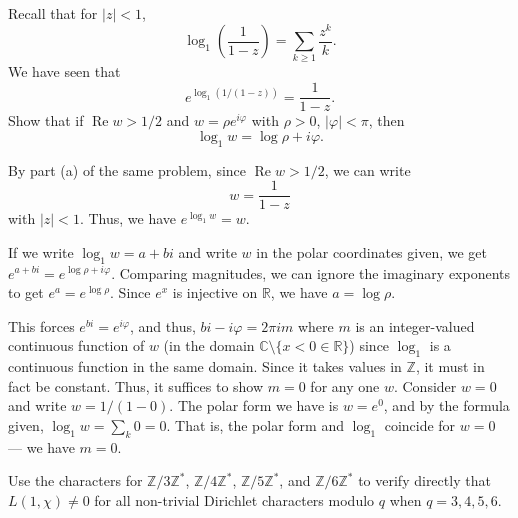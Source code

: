 \documentclass[12 pt, letterpaper]{hmcpset}
\begin{document}
\begin{problem}[S \& S \S 8.4 \#7(b)]
	Recall that for $\lvert z \rvert < 1$,
	\[
		\log_{1} \left ( \frac{1}{1 - z} \right ) = \sum_{k \ge 1} \frac{z^{k}}{k}.
	\]
	We have seen that
	\[
		e^{\log_{1} (1 / (1 - z))} = \frac{1}{1 - z}.
	\]
	Show that if $\operatorname{Re} w > 1 /2$ and $w = \rho e^{i \varphi}$ with $\rho > 0$, $\lvert \varphi \rvert < \pi$, then
	\[
		\log_{1} w = \log \rho + i \varphi.
	\]
\end{problem}

\begin{solution}
	By part (a) of the same problem, since $\operatorname{Re} w > 1 / 2$, we can write
	\[
		w = \frac{1}{1 - z}
	\]
	with $\lvert z \rvert < 1$. Thus, we have $e^{\log_{1} w} = w$.

	If we write $\log_{1} w = a + b i$ and write $w$ in the polar coordinates given, we get $e^{a + b i} = e^{\log \rho + i \varphi}$. Comparing magnitudes, we can ignore the imaginary exponents to get $e^{a} = e^{\log \rho}$. Since $e^{x}$ is injective on $\mathbb{R}$, we have $a = \log \rho$.

	This forces $e^{bi} = e^{i \varphi}$, and thus, $bi - i \varphi = 2 \pi i m$ where $m$ is an integer-valued continuous function of $w$ (in the domain $\mathbb{C} \setminus \{ x < 0 \in \mathbb{R} \}$) since $\log_{1}$ is a continuous function in the same domain. Since it takes values in $\mathbb{Z}$, it must in fact be constant. Thus, it suffices to show $m = 0$ for any one $w$. Consider $w = 0$ and write $w = 1 / (1 - 0)$. The polar form we have is $w = e^{0}$, and by the formula given, $\log_{1} w = \sum_{k} 0 = 0$. That is, the polar form and $\log_{1}$ coincide for $w = 0$ --- we have $m = 0$.
\end{solution}

\pagebreak

\begin{problem}[S \& S \S 8.4 \#11]
	Use the characters for $\mathbb{Z} / 3 \mathbb{Z}^{*}$, $\mathbb{Z} / 4 \mathbb{Z}^{*}$, $\mathbb{Z} / 5 \mathbb{Z}^{*}$, and $\mathbb{Z} / 6 \mathbb{Z}^{*}$ to verify directly that $L(1, \chi) \neq 0$ for all non-trivial Dirichlet characters modulo $q$ when $q = 3, 4, 5, 6$.
\end{problem}
\end{document}
